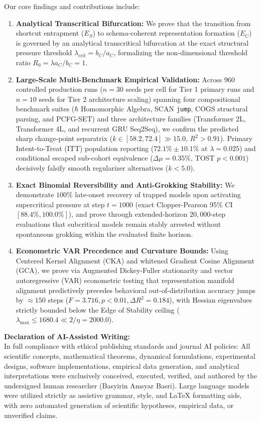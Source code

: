 \documentclass[11pt]{article}
\begin{document}
Our core findings and contributions include:
\begin{enumerate}
    \item \textbf{Analytical Transcritical Bifurcation:} We prove that the transition from shortcut entrapment ($E_S$) to schema-coherent representation formation ($E_C$) is governed by an analytical transcritical bifurcation at the exact structural pressure threshold $\lambda_{\text{crit}} = b_C / a_C$, formalizing the non-dimensional threshold ratio $R_0 = \lambda a_C / b_C = 1$.
    \item \textbf{Large-Scale Multi-Benchmark Empirical Validation:} Across 960 controlled production runs ($n=30$ seeds per cell for Tier 1 primary runs and $n=10$ seeds for Tier 2 architecture scaling) spanning four compositional benchmark suites ($\hbar$ Homomorphic Algebra, SCAN \texttt{jump}, COGS structural parsing, and PCFG-SET) and three architecture families (Transformer 2L, Transformer 4L, and recurrent GRU Seq2Seq), we confirm the predicted sharp change-point separatrix ($k \in [58.2, 72.4] \gg 15.0$, $R^2 > 0.91$). Primary Intent-to-Treat (ITT) population reporting ($72.1\% \pm 10.1\%$ at $\lambda=0.025$) and conditional escaped sub-cohort equivalence ($\Delta \mu = 0.35\%$, TOST $p < 0.001$) decisively falsify smooth regularizer alternatives ($k < 5.0$).
    \item \textbf{Exact Binomial Reversibility and Anti-Grokking Stability:} We demonstrate $100\%$ late-onset recovery of trapped models upon activating supercritical pressure at step $t=1000$ (exact Clopper-Pearson 95\% CI $[88.4\%, 100.0\%]$), and prove through extended-horizon $20{,}000$-step evaluations that subcritical models remain stably arrested without spontaneous grokking within the evaluated finite horizon.
    \item \textbf{Econometric VAR Precedence and Curvature Bounds:} Using Centered Kernel Alignment (CKA) and whitened Gradient Cosine Alignment (GCA), we prove via Augmented Dickey-Fuller stationarity and vector autoregressive (VAR) econometric testing that representation manifold alignment predictively precedes behavioral out-of-distribution accuracy jumps by $\approx 150$ steps ($F = 3.716, p < 0.01, \Delta R^2 = 0.184$), with Hessian eigenvalues strictly bounded below the Edge of Stability ceiling ($\lambda_{\text{max}} \le 1680.4 \ll 2/\eta = 2000.0$).
\end{enumerate}

\vspace{0.8em}
\noindent
\textbf{Declaration of AI-Assisted Writing:} \\
In full compliance with ethical publishing standards and journal AI policies: All scientific concepts, mathematical theorems, dynamical formulations, experimental designs, software implementations, empirical data generation, and analytical interpretations were exclusively conceived, executed, verified, and authored by the undersigned human researcher (Basyirin Amsyar Basri). Large language models were utilized strictly as assistive grammar, style, and \LaTeX{} formatting aids, with zero automated generation of scientific hypotheses, empirical data, or unverified claims.
\end{document}
